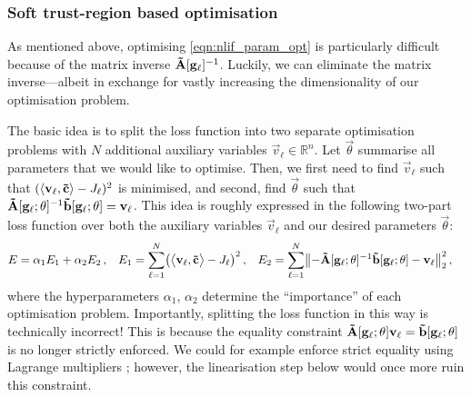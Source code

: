 \subsubsection{Soft trust-region based optimisation}
As mentioned above, optimising \cref{eqn:nlif_param_opt} is particularly difficult because of the matrix inverse $\mathbf{\tilde A}[\mathbf{g}_\ell]^{-1}$.
Luckily, we can eliminate the matrix inverse---albeit in exchange for vastly increasing the dimensionality of our optimisation problem.

The basic idea is to split the loss function into two separate optimisation problems with $N$ additional auxiliary variables $\vec v_\ell \in \mathbb{R}^n$.
Let $\vec \theta$ summarise all parameters that we would like to optimise.
Then, we first need to find $\vec v_\ell$ such that $(\langle \mathbf{v}_\ell, \mathbf{\tilde c} \rangle - J_\ell)^2$ is minimised, and second, find $\vec \theta$ such that $\mathbf{\tilde A}[\mathbf{g}_\ell; \mathbf{\theta}]^{-1} \mathbf{\tilde b}[\mathbf{g}_\ell; \mathbf{\theta}] = \mathbf{v}_\ell$.
This idea is roughly expressed in the following two-part loss function over both the auxiliary variables $\vec v_\ell$ and our desired parameters $\vec \theta$:%
\begin{align}
	E &= \alpha_1 E_1 + \alpha_2 E_2 \,, &
	E_1 &=  \sum_{\ell = 1}^N \bigl( \big\langle \mathbf{v}_\ell, \mathbf{\tilde c} \big\rangle - J_\ell \bigr)^2 \,, &
	E_2 &= \sum_{\ell = 1}^N \bigl\| -\mathbf{\tilde A}[\mathbf{g}_\ell; \mathbf{\theta}]^{-1} \mathbf{\tilde b}[\mathbf{g}_\ell; \mathbf{\theta}] - \mathbf{v}_\ell \bigr\|_2^2 \,,
\end{align}
where the hyperparameters $\alpha_1$, $\alpha_2$ determine the \enquote{importance} of each optimisation problem.
Importantly, splitting the loss function in this way is technically incorrect!
This is because the equality constraint $\mathbf{\tilde A}[\mathbf{g}_\ell; \mathbf{\theta}] \mathbf{v}_\ell = \mathbf{\tilde b}[\mathbf{g}_\ell; \mathbf{\theta}]$ is no longer strictly enforced.
We could for example enforce strict equality using Lagrange multipliers \citep[e.g.,][Section~5.1]{boyd2004convex}; however, the linearisation step below would once more ruin this constraint.


